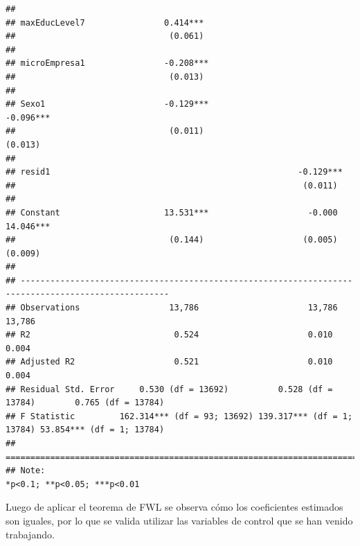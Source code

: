 \documentclass[
]{article}
\begin{document}
\begin{verbatim}
##                                                                                                     
## maxEducLevel7                0.414***                                                               
##                               (0.061)                                                               
##                                                                                                     
## microEmpresa1                -0.208***                                                              
##                               (0.013)                                                               
##                                                                                                     
## Sexo1                        -0.129***                                             -0.096***        
##                               (0.011)                                               (0.013)         
##                                                                                                     
## resid1                                                  -0.129***                                   
##                                                          (0.011)                                    
##                                                                                                     
## Constant                     13.531***                    -0.000                   14.046***        
##                               (0.144)                    (0.005)                    (0.009)         
##                                                                                                     
## ----------------------------------------------------------------------------------------------------
## Observations                  13,786                      13,786                    13,786          
## R2                             0.524                      0.010                      0.004          
## Adjusted R2                    0.521                      0.010                      0.004          
## Residual Std. Error     0.530 (df = 13692)          0.528 (df = 13784)        0.765 (df = 13784)    
## F Statistic         162.314*** (df = 93; 13692) 139.317*** (df = 1; 13784) 53.854*** (df = 1; 13784)
## ====================================================================================================
## Note:                                                                    *p<0.1; **p<0.05; ***p<0.01
\end{verbatim}

Luego de aplicar el teorema de FWL se observa cómo los coeficientes
estimados son iguales, por lo que se valida utilizar las variables de
control que se han venido trabajando.
\end{document}
